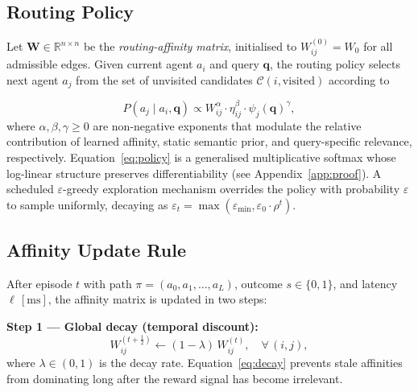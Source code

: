 \documentclass[journal,twocolumn,letterpaper]{IEEEtran}
\newcommand{\WW}{\mathbf{W}}
\newcommand{\RR}{\mathbb{R}}
\begin{document}
\subsection{Routing Policy}

Let $\WW\in\RR^{n\times n}$ be the \emph{routing-affinity matrix},
initialised to $W_{ij}^{(0)}=W_0$ for all admissible edges.
Given current agent $a_i$ and query $\mathbf{q}$, the routing policy
selects next agent $a_j$ from the set of unvisited candidates
$\mathcal{C}(i,\text{visited})$ according to

\begin{equation}
  P(a_j \mid a_i, \mathbf{q}) \propto
  W_{ij}^{\alpha} \cdot \eta_{ij}^{\beta} \cdot \psi_j(\mathbf{q})^{\gamma},
\label{eq:policy}
\end{equation}
where $\alpha,\beta,\gamma\geq 0$ are non-negative exponents that modulate the
relative contribution of learned affinity, static semantic prior, and
query-specific relevance, respectively.  Equation~\eqref{eq:policy} is a
generalised multiplicative softmax whose log-linear structure preserves
differentiability (see Appendix~\ref{app:proof}).  A scheduled $\varepsilon$-greedy
exploration mechanism overrides the policy with probability $\varepsilon$ to
sample uniformly, decaying as $\varepsilon_t = \max(\varepsilon_{\min},
\varepsilon_0 \cdot \rho^t)$.

\subsection{Affinity Update Rule}

After episode $t$ with path $\pi=(a_0,a_1,\ldots,a_L)$, outcome
$s\in\{0,1\}$, and latency $\ell\,[\mathrm{ms}]$, the affinity matrix is
updated in two steps:

\medskip
\noindent\textbf{Step 1 — Global decay (temporal discount):}
\begin{equation}
  W_{ij}^{(t+\tfrac{1}{2})} \leftarrow (1-\lambda)\,W_{ij}^{(t)},
  \quad \forall\,(i,j),
\label{eq:decay}
\end{equation}
where $\lambda\in(0,1)$ is the decay rate.  Equation~\eqref{eq:decay} prevents
stale affinities from dominating long after the reward signal has become
irrelevant.
\end{document}
